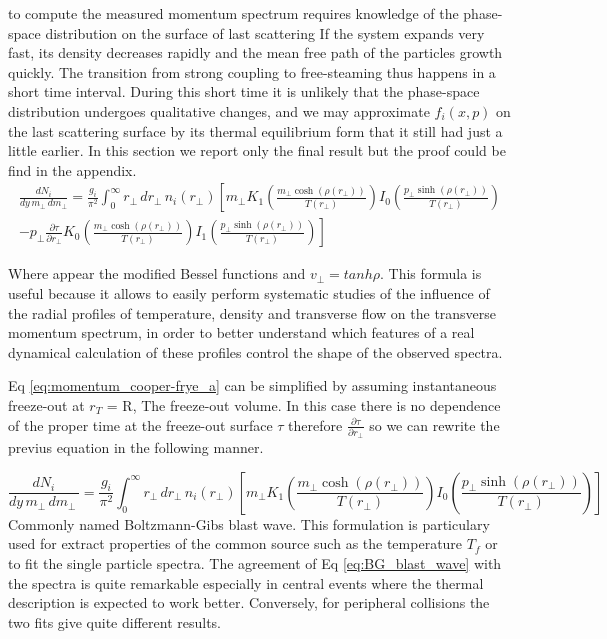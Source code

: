 \documentclass[12pt,a4paper]{book}
\begin{document}
	to compute the measured momentum spectrum requires knowledge of the phase-space distribution on the surface of last scattering If the system expands very fast, its density decreases rapidly and the mean free path of the particles growth quickly. The transition from strong coupling to free-steaming thus happens in a short time interval. During this short time it is unlikely that the phase-space distribution undergoes qualitative changes, and we may approximate $f_i(x, p)$ on the last scattering surface by its thermal equilibrium form that it still had just a little earlier. In this section we report only the final result but the proof could be find in the appendix.
	\begin{equation}
		\begin{aligned}
			\frac{dN_i}{dy \, m_\perp \, dm_\perp} = \frac{g_i}{\pi^2} \int_{0}^{\infty} r_\perp \, dr_\perp \, n_i(r_\perp) \left[ 
			m_\perp K_1 \left( \frac{m_\perp \cosh(\rho(r_\perp))}{T(r_\perp)}\right) I_0 \left( \frac{p_\perp \sinh(\rho(r_\perp))}{T(r_\perp)} \right) \right. \\
			\left. - p_\perp \frac{\partial \tau}{\partial r_\perp} K_0 \left( \frac{m_\perp \cosh(\rho(r_\perp))}{T(r_\perp)}\right) I_1 \left( \frac{p_\perp \sinh(\rho(r_\perp))}{T(r_\perp)} \right) \right]
		\end{aligned}
		\label{eq:momentum_cooper-frye}
	\end{equation}
	
	Where appear the modified Bessel functions and $v_\perp= tanh \rho$. This formula is useful because it allows to easily perform systematic studies of the influence of the radial profiles of temperature, density and transverse flow on the transverse momentum spectrum, in order to better understand which features of a real dynamical calculation of these profiles control the shape of the observed spectra.
	
	Eq \ref{eq:momentum_cooper-frye_a} can be simplified by assuming instantaneous freeze-out at $r_T$ = R, The freeze-out volume. In this case there	is no dependence of the proper time at the freeze-out surface $\tau$ therefore $\frac{\partial \tau}{\partial r_\perp}$ so we can rewrite the previus equation in the following manner.
	
	\begin{equation}
		\frac{dN_i}{dy \, m_\perp \, dm_\perp \,} = \frac{g_i}{\pi^2} \int_{0}^{\infty} r_\perp \, dr_\perp \, n_i(r_\perp) \left[ m_\perp K_1 \left( \frac{m_\perp \cosh(\rho(r_\perp))}{T(r_\perp)}\right) I_0 \left( \frac{p_\perp \sinh(\rho(r_\perp))}{T(r_\perp)} \right) \right]
		\label{eq:BG_blast_wave}
	\end{equation}
	Commonly named Boltzmann-Gibs blast wave. This formulation is particulary used for extract properties of the common source such as the temperature $T_f$ or to fit the single particle spectra. The agreement of Eq \ref{eq:BG_blast_wave} with the spectra is quite remarkable especially in central events where the thermal description is expected to work better. Conversely, for peripheral collisions the two fits give quite different results.
	
\end{document}
